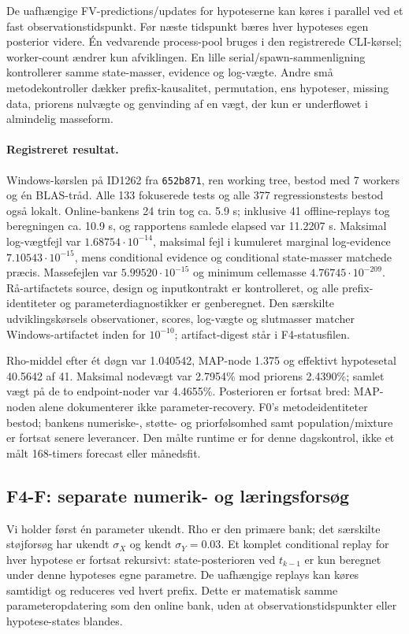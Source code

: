 De uafhængige FV-predictions/updates for hypoteserne kan køres i parallel ved et
fast observationstidspunkt. Før næste tidspunkt bæres hver hypoteses egen
posterior videre. Én vedvarende process-pool bruges i den registrerede CLI-kørsel;
worker-count ændrer kun afviklingen. En lille serial/spawn-sammenligning kontrollerer
samme state-masser, evidence og log-vægte. Andre små metodekontroller dækker
prefix-kausalitet, permutation, ens hypoteser, missing data, priorens nulvægte
og genvinding af en vægt, der kun er underflowet i almindelig masseform.

\paragraph{Registreret resultat.}
Windows-kørslen på ID1262 fra \texttt{652b871}, ren working tree, bestod
med 7 workers og én BLAS-tråd. Alle 133 fokuserede tests og alle 377
regressionstests bestod også lokalt. Online-bankens 24 trin tog ca. 5.9 s;
inklusive 41 offline-replays tog beregningen ca. 10.9 s, og rapportens
samlede elapsed var 11.2207 s.
Maksimal log-vægtfejl var \(1.68754\cdot10^{-14}\), maksimal fejl i
kumuleret marginal log-evidence \(7.10543\cdot10^{-15}\), mens conditional
evidence og conditional state-masser matchede præcis. Massefejlen var
\(5.99520\cdot10^{-15}\) og minimum cellemasse \(4.76745\cdot10^{-209}\).
Rå-artifactets source, design og inputkontrakt er kontrolleret, og alle
prefix-identiteter og parameterdiagnostikker er genberegnet. Den særskilte
udviklingskørsels observationer, scores, log-vægte og slutmasser matcher
Windows-artifactet inden for \(10^{-10}\); artifact-digest står i F4-statusfilen.

Rho-middel efter ét døgn var 1.040542, MAP-node 1.375 og effektivt hypotesetal
40.5642 af 41. Maksimal nodevægt var 2.7954\% mod priorens 2.4390\%; samlet
vægt på de to endpoint-noder var 4.4655\%. Posterioren er fortsat bred:
MAP-noden alene dokumenterer ikke parameter-recovery. F0's metodeidentiteter
bestod; bankens numeriske-, støtte- og priorfølsomhed samt population/mixture
er fortsat senere leverancer. Den målte runtime er for denne dagskontrol,
ikke et målt 168-timers forecast eller månedsfit.

\subsection*{F4-F: separate numerik- og læringsforsøg}
Vi holder først én parameter ukendt. Rho er den primære bank; det særskilte
støjforsøg har ukendt \(\sigma_X\) og kendt \(\sigma_Y=0.03\). Et komplet
conditional replay for hver hypotese er fortsat rekursivt: state-posterioren
ved \(t_{k-1}\) er kun beregnet under denne hypoteses egne parametre.
De uafhængige replays kan køres samtidigt og reduceres ved hvert prefix.
Dette er matematisk samme parameteropdatering som den online bank, uden
at observationstidspunkter eller hypotese-states blandes.

